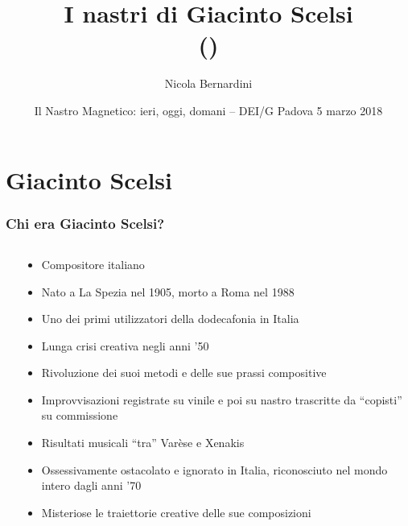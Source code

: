 \documentclass[compress,xcolor=dvipsnames]{beamer}
\title[Recovering Scelsi's Tapes]%
{%
  I nastri di Giacinto Scelsi\\
	{\tiny (\rcstag)}
}
\author{%
	Nicola Bernardini\\
    \href{mailto:\cpholderemail}{\cpholderemail}
}
\institute[SME-CCPPD]%
{%
	\href{http://www.scelsi.it}{Fondazione Isabella Scelsi -- Roma}\\
	\href{http://www.conservatoriopollini.it}
		 {Conservatorio di Musica ``C.Pollini'' -- Padova}
}
\date[05/03/2018]{Il Nastro Magnetico: ieri, oggi, domani -- DEI/G Padova 5 marzo 2018}
\newcommand{\Scelsi}{Giacinto Scelsi\xspace}
\begin{document}
  
\begin{frame}
	\titlepage
\end{frame}
  
%
%
\section{\Scelsi}

\begin{frame}
	\frametitle{Chi era \Scelsi?}

 	\begin{columns}[T]
      \begin{column}{0.3\textwidth}
          \begin{center}
 		      \end{center}
 	  \end{column}
    \begin{column}{0.65\textwidth}
    {
			\begin{itemize}%
	
				\item Compositore italiano
				\item Nato a La Spezia nel 1905, morto a Roma nel 1988
	      \item Uno dei primi utilizzatori della dodecafonia in Italia
				\item Lunga crisi creativa negli anni '50
				\item Rivoluzione dei suoi metodi e delle sue prassi compositive
				\item Improvvisazioni registrate su vinile e poi su nastro
	            trascritte da ``copisti'' su commissione
	      \item Risultati musicali ``tra'' Var\`ese e Xenakis
	      \item Ossessivamente ostacolato e ignorato in Italia, riconosciuto nel
	          mondo intero dagli anni '70
	      \item Misteriose le traiettorie creative delle sue composizioni
	
			\end{itemize}
		}
		\end{column}
  \end{columns}

\end{frame}
\end{document}
